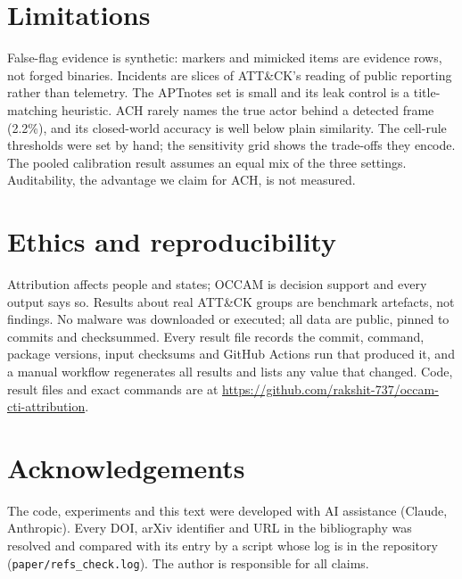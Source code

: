 \documentclass[11pt]{article}
\begin{document}
\section{Limitations}
False-flag evidence is synthetic: markers and mimicked items are evidence
rows, not forged binaries. Incidents are slices of ATT\&CK's reading of
public reporting rather than telemetry. The APTnotes set is small and its
leak control is a title-matching heuristic. ACH rarely names the true actor
behind a detected frame (2.2\%), and its closed-world accuracy is well below
plain similarity. The cell-rule thresholds were set by hand; the sensitivity
grid shows the trade-offs they encode. The pooled calibration result assumes
an equal mix of the three settings. Auditability, the advantage we claim for
ACH, is not measured.

\section{Ethics and reproducibility}
Attribution affects people and states; OCCAM is decision support and every
output says so. Results about real ATT\&CK groups are benchmark artefacts, not
findings. No malware was downloaded or executed; all data are public, pinned
to commits and checksummed. Every result file records the commit, command,
package versions, input checksums and GitHub Actions run that produced it, and
a manual workflow regenerates all results and lists any value that changed.
Code, result files and exact commands are at
\url{https://github.com/rakshit-737/occam-cti-attribution}.

\section*{Acknowledgements}
The code, experiments and this text were developed with AI assistance
(Claude, Anthropic). Every DOI, arXiv identifier and URL in the bibliography
was resolved and compared with its entry by a script whose log is in the
repository (\texttt{paper/refs\_check.log}). The author is responsible for all
claims.



\end{document}
